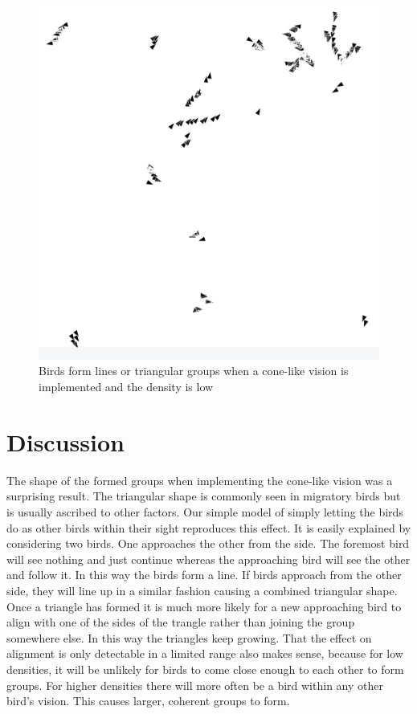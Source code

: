 \documentclass[twoside,twocolumn]{article}
\begin{document}
\begin{figure}[!htb]
\begin{center}
\includegraphics[width=\columnwidth]{angles}
\end{center}
\caption{Birds form lines or triangular groups when a cone-like vision is implemented and the density is low}\label{fig:angle-birds}
\end{figure}

\section{Discussion}

The shape of the formed groups when implementing the cone-like vision was a surprising result.
The triangular shape is commonly seen in migratory birds but is usually ascribed to other factors.
Our simple model of simply letting the birds do as other birds within their sight reproduces this
effect. It is easily explained by considering two birds. One approaches the other from the side.
The foremost bird will see nothing and just continue whereas the approaching bird will see the
other and follow it.
In this way the birds form a line. If birds approach from the other side, they will line
up in a similar fashion causing a combined triangular shape. Once a triangle has formed it is much
more likely for a new approaching bird to align with one of the sides of the trangle rather than
joining the group somewhere else. In this way the triangles keep growing.
That the effect on alignment is only detectable in a limited range also makes sense, because for
low densities, it will be unlikely for birds to come close enough to each other to form groups.
For higher densities there will more often be a bird within any other bird's vision. This causes
larger, coherent groups to form.
\end{document}
